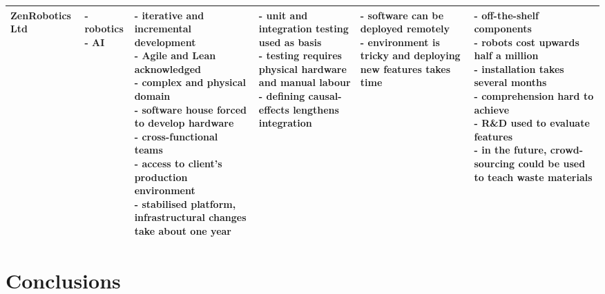\documentclass[english]{tktltiki2}
\begin{document}
\begin{landscape}
\begin{longtable}{|p{2.5cm}|p{1.5cm}|p{4cm}|p{4cm}|p{4cm}|p{4cm}|}
        ZenRobotics Ltd &
        \parbox[t]{1.5cm}{- robotics \\
                          - AI} &
        \parbox[t]{4cm}{- iterative and incremental development \\
                        - Agile and Lean acknowledged \\
                        - complex and physical domain \\
                        - software house forced to develop hardware \\
                        - cross-functional teams \\
                        - access to client’s production environment \\
                        - stabilised platform, infrastructural changes take about one year} &
        \parbox[t]{4cm}{- unit and integration testing used as basis \\
                        - testing requires physical hardware and manual labour \\
                        - defining causal-effects lengthens integration} &
        \parbox[t]{4cm}{- software can be deployed remotely \\
                        - environment is tricky and deploying new features takes time} &
        \parbox[t]{4cm}{- off-the-shelf components \\
                        - robots cost upwards half a million \\
                        - installation takes several months \\
                        - comprehension hard to achieve \\
                        - R\&D used to evaluate features \\
                        - in the future, crowd-sourcing could be used to teach waste materials} \\

        \hline

    \end{longtable}

\end{landscape}
\restoregeometry


\section{Conclusions}
\end{document}
